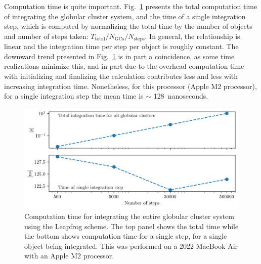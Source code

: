         Computation time is quite important. Fig.~\ref{fig:numericalErrorGlobularClustersComputationTime} presents the total computation time of integrating the globular cluster system, and the time of a single integration step, which is computed by normalizing the total time by the number of objects and number of steps taken: $T_{\mathrm{total}}/N_{\mathrm{GCs}}/N_{\mathrm{steps}}$. In general, the relationship is linear and the integration time per step per object is roughly constant. The downward trend presented in Fig.~\ref{fig:numericalErrorGlobularClustersComputationTime} is in part a coincidence, as some time realizations minimize this, and in part due to the overhead computation time with initializing and finalizing the calculation contributes less and less with increasing integration time. Nonetheless, for this processor (Apple M2 processor), for a single integration step the mean time is $\sim$ 128~nanoseconds. 
        \begin{figure}
            \centering
            \includegraphics[width=\linewidth]{images/numericalErrorGlobularClustersComputationTime.png}
            \caption[Scaling of the computation time with the number of timesteps]{Computation time for integrating the entire globular cluster system using the Leapfrog scheme. The top panel shows the total time while the bottom shows computation time for a single step, for a single object being integrated. This was performed on a 2022 MacBook Air with an Apple M2 processor. }
            \label{fig:numericalErrorGlobularClustersComputationTime}
        \end{figure}

